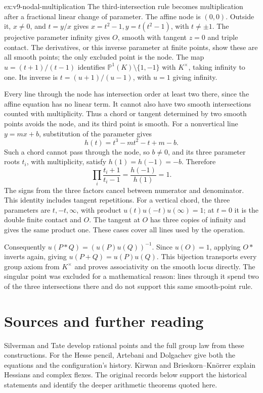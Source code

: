 \begin{solution}{ex:v9-nodal-multiplication}
\idea The third-intersection rule becomes multiplication after a fractional linear change of parameter.
\writeup The affine node is $(0,0)$. Outside it, $x\ne0$, and $t=y/x$ gives $x=t^2-1,y=t(t^2-1)$, with $t\ne\pm1$. The projective parameter infinity gives $O$, smooth with tangent $z=0$ and triple contact. The derivatives, or this inverse parameter at finite points, show these are all smooth points; the only excluded point is the node. The map $u=(t+1)/(t-1)$ identifies $\mathbb P^1(K)\setminus\{1,-1\}$ with $K^\times$, taking infinity to one. Its inverse is $t=(u+1)/(u-1)$, with $u=1$ giving infinity.

Every line through the node has intersection order at least two there, since the affine equation has no linear term. It cannot also have two smooth intersections counted with multiplicity. Thus a chord or tangent determined by two smooth points avoids the node, and its third point is smooth. For a nonvertical line $y=mx+b$, substitution of the parameter gives
\[
h(t)=t^3-mt^2-t+m-b.
\]
Such a chord cannot pass through the node, so $b\ne0$, and its three parameter roots $t_i$, with multiplicity, satisfy $h(1)=h(-1)=-b$. Therefore
\[
\prod_i\frac{t_i+1}{t_i-1}=\frac{h(-1)}{h(1)}=1.
\]
The signs from the three factors cancel between numerator and denominator. This identity includes tangent repetitions. For a vertical chord, the three parameters are $t,-t,\infty$, with product $u(t)u(-t)u(\infty)=1$; at $t=0$ it is the double finite contact and $O$. The tangent at $O$ has three copies of infinity and gives the same product one. These cases cover all lines used by the operation.

Consequently $u(P*Q)=(u(P)u(Q))^{-1}$. Since $u(O)=1$, applying $O*\,$ inverts again, giving $u(P+Q)=u(P)u(Q)$. This bijection transports every group axiom from $K^\times$ and proves associativity on the smooth locus directly. The singular point was excluded for a mathematical reason: lines through it spend two of the three intersections there and do not support this same smooth-point rule.
\end{solution}

\section*{Sources and further reading}

Silverman and Tate develop rational points and the full group law from these constructions. For the Hesse pencil, Artebani and Dolgachev give both the equations and the configuration's history. Kirwan and Brieskorn--Kn\"orrer explain Hessians and complex flexes. The original records below support the historical statements and identify the deeper arithmetic theorems quoted here.

